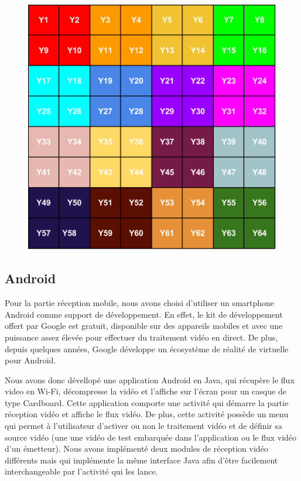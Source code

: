\documentclass[11pt,a4paper]{article}
\begin{document}
\begin{figure}[H]
\begin{center}
\includegraphics[scale=0.7]{images/yuv1.png}
\end{center}
\caption{}
\label{}
\end{figure}


\subsection{Android}
Pour la partie réception mobile, nous avons choisi d'utiliser un smartphone Android comme support de développement.
En effet, le kit de développement offert par Google est gratuit, disponible sur des appareils mobiles et avec une puissance assez élevée pour effectuer du traitement vidéo en direct.
De plus, depuis quelques années, Google développe un écosystème de réalité de virtuelle pour Android.

\bigbreak
Nous avons donc dévellopé une application Android en Java, qui récupère le flux video en Wi-Fi, décompresse la vidéo et l'affiche sur l'écran pour un casque de type Cardboard.
Cette application comporte une activité qui démarre la partie réception vidéo et affiche le flux vidéo. De plus, cette activité possède un menu qui permet à l'utilisateur d'activer ou non le traitement vidéo et de définir sa source vidéo (une une vidéo de test embarquée dans l'application ou le flux vidéo d'un émetteur).
Nous avons implémenté deux modules de réception vidéo différents mais qui implémente la même interface Java afin d'être facilement interchangeable par l'activité qui les lance.
\end{document}
